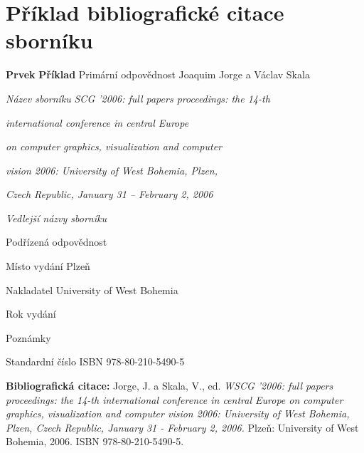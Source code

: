 
\newpage
\section*{Příklad bibliografické citace sborníku}
\label{pr-sbornik}
\begin{tabbing}
\zarazky
\textbf{Prvek} \> \textbf{Příklad} \odradkovani
Primární odpovědnost \>
Joaquim Jorge a Václav Skala

\odradkovani
{\em Název sborníku} \>
{\em SCG ’2006: full papers proceedings: the 14-th}

    \odradkovani \>
    {\em international conference in central Europe}
    
    \odradkovani \>
    {\em on computer graphics, visualization and computer}
    
    \odradkovani \>
    {\em vision 2006: University of West Bohemia, Plzen,}

    \odradkovani \>
    {\em Czech Republic, January 31 -- February 2, 2006}
    
\odradkovani
{\em Vedlejší názvy sborníku}\footnotemark[1] \>

\odradkovani
Podřízená odpovědnost\footnotemark[1] \>

\odradkovani
Místo vydání \>
Plzeň

\odradkovani
Nakladatel \>
University of West Bohemia

\odradkovani
Rok vydání 

\odradkovani
Poznámky\footnotemark[2] \>

\odradkovani
Standardní číslo \>
ISBN 978-80-210-5490-5

\odradkovani
\end{tabbing}

\noindent \textbf{Bibliografická citace:} \odradkovani
{\sc Jorge}, J. a {\sc Skala}, V., ed. {\em WSCG ’2006: full papers proceedings: the 14-th
international conference in central Europe on computer graphics, visualization and
computer vision 2006: University of West Bohemia, Plzen, Czech Republic, January
31 - February 2, 2006.} Plzeň: University of West Bohemia, 2006. ISBN
978-80-210-5490-5.

